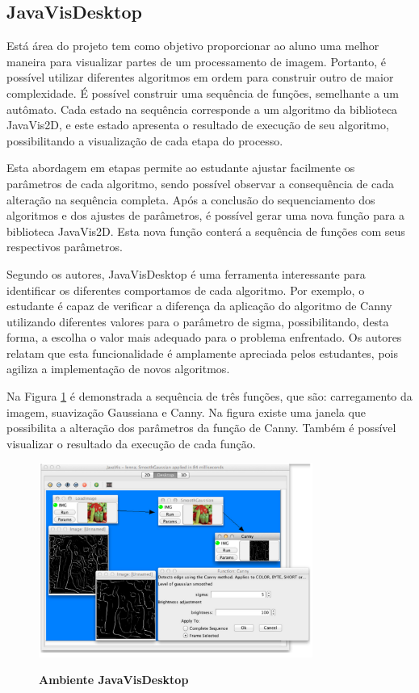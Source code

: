 \documentclass[
	12pt,				%
	oneside,			%
	a4paper,			%
	english,			%
	french,				%
	spanish,			%
	brazil,				%
	]{abntex2}
\begin{document}
\subsection{JavaVisDesktop}

Está área do projeto tem como objetivo proporcionar ao aluno uma melhor maneira para visualizar partes de um processamento de imagem. Portanto, é possível utilizar diferentes algoritmos em ordem para construir outro de maior complexidade. É possível construir uma sequência de funções, semelhante a um autômato. Cada estado na sequência corresponde a um algoritmo da biblioteca JavaVis2D, e este estado apresenta o resultado de execução de seu algoritmo, possibilitando a visualização de cada etapa do processo.

Esta abordagem em etapas permite ao estudante ajustar facilmente os parâmetros de cada algoritmo, sendo possível observar a consequência de cada alteração na sequência completa. Após a conclusão do sequenciamento dos algoritmos e dos ajustes de parâmetros, é possível gerar uma nova função para a biblioteca JavaVis2D. Esta nova função conterá a sequência de funções com seus respectivos parâmetros.

Segundo os autores, JavaVisDesktop é uma ferramenta interessante para identificar os diferentes comportamos de cada algoritmo. Por exemplo, o estudante é capaz de verificar a diferença da aplicação do algoritmo de Canny utilizando diferentes valores para o parâmetro de sigma, possibilitando, desta forma, a escolha o valor mais adequado para o problema enfrentado. Os autores relatam que esta funcionalidade é amplamente apreciada pelos estudantes, pois agiliza a implementação de novos algoritmos.

Na Figura \ref{fig:javavis_desktop} é demonstrada a sequência de três funções, que são: carregamento da imagem, suavização Gaussiana e Canny. Na figura existe uma janela que possibilita a alteração dos parâmetros da função de Canny. Também é possível visualizar o resultado da execução de cada função.

\begin{figure}[ht]
\centering
\caption{\textbf{Ambiente JavaVisDesktop}}
\includegraphics[width=0.8\textwidth]{imagens/javavis_desktop.png}
\label{fig:javavis_desktop}
\end{figure}
\end{document}
